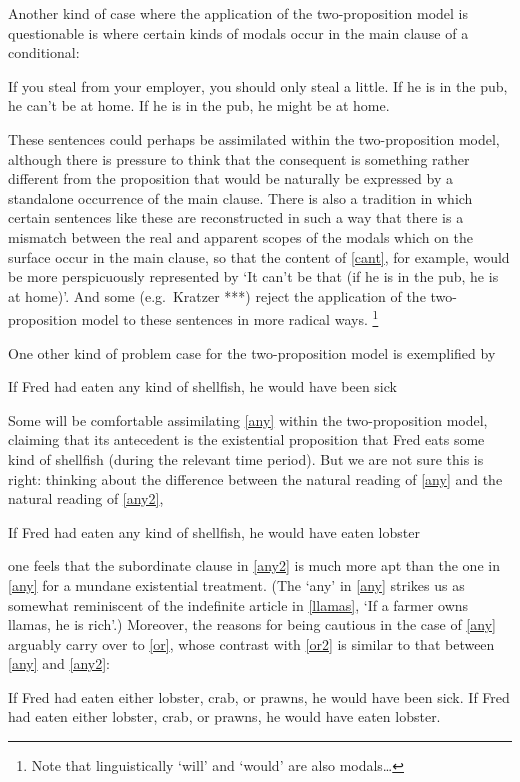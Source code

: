 \documentclass[If.tex]{subfiles}
\begin{document}
Another kind of case where the application of the two-proposition model is questionable is where certain kinds of modals occur in the main clause of a conditional:
\begin{prop}
	\nitem 
	If you steal from your employer, you should only steal a little.
	\nitem \label{cant} 
	If he is in the pub, he can't be at home.
	\nitem 
	If he is in the pub, he might be at home.
\end{prop}
These sentences could perhaps be assimilated within the two-proposition model, although there is pressure to think that the consequent is something rather different from the proposition that would be naturally be expressed by a standalone occurrence of the main clause. There is also a tradition in which certain sentences like these are reconstructed in such a way that there is a mismatch between the real and apparent scopes of the modals which on the surface occur in the main clause, so that the content of \ref{cant}, for example, would be more perspicuously represented by ‘It can't be that (if he is in the pub, he is at home)’. And some (e.g.~Kratzer ***) reject the application of the two-proposition model to these sentences in more radical ways.%
\footnote{Note that linguistically ‘will’ and ‘would’ are also modals\ldots{}}

One other kind of problem case for the two-proposition model is exemplified by
\begin{prop}
	\nitem \label{any} 
	If Fred had eaten any kind of shellfish, he would have been sick
\end{prop}
Some will be comfortable assimilating \ref{any} within the two-proposition model, claiming that its antecedent is the existential proposition that Fred eats some kind of shellfish (during the relevant time period). But we are not sure this is right: thinking about the difference between the natural reading of \ref{any} and the natural reading of \ref{any2},
\begin{prop}
	\nitem \label{any2} 
	If Fred had eaten any kind of shellfish, he would have eaten lobster
\end{prop}
one feels that the subordinate clause in \ref{any2} is much more apt than the one in \ref{any} for a mundane existential treatment. (The ‘any’ in \ref{any} strikes us as somewhat reminiscent of the indefinite article in \ref{llamas}, ‘If a farmer owns llamas, he is rich’.) Moreover, the reasons for being cautious in the case of \ref{any} arguably carry over to \ref{or}, whose contrast with \ref{or2} is similar to that between \ref{any} and \ref{any2}:
\begin{prop}
	\nitem \label{or} 
	If Fred had eaten either lobster, crab, or prawns, he would have been sick.
	\nitem \label{or2} 
	If Fred had eaten either lobster, crab, or prawns, he would have eaten lobster.
\end{prop}
\end{document}
